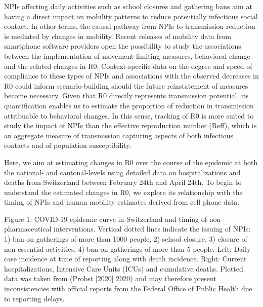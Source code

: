 NPIs affecting daily activities such as school closures and gathering bans aim at having a direct impact on mobility patterns to reduce potentially infectious social contact. In other terms, the causal pathway from NPIs to transmission reduction is mediated by changes in mobility. Recent releases of mobility data from smartphone software providers open the possibility to study the associations between the implementation of movement-limiting measures, behavioral change and the related changes in R0.  Context-specific data on the degree and speed of compliance to these types of NPIs and associations with the observed decreases in R0 could inform scenario-building should the future reinstatement of measures become necessary. Given that R0 directly represents transmission potential, its quantification enables us to estimate the proportion of reduction in transmission attribuable to behavioral changes. In this sense, tracking of R0 is more suited to study the impact of NPIs than the effective reproduction number (Reff), which is an aggregate measure of transmission capturing aspects of both infectious contacts and of population susceptibility.

Here, we aim at estimating changes in R0 over the course of the epidemic at both the national- and cantonal-levels using detailed data on hospitalizations and deaths from Switzerland between February 24th and April 24th. To begin to understand the estimated changes in R0, we explore its relationship with the timing of NPIs and human mobility estimates derived from cell phone data. 

Figure 1: COVID-19 epidemic curve in Switzerland and timing of non-pharmaceutical interventions.  Vertical dotted lines indicate the issuing of NPIs: 1) ban on gatherings of more than 1000 people, 2) school closure, 3) closure of non-essential activities, 4) ban on gatherings of more than 5 people.  Left: Daily case incidence at time of reporting along with death incidence. Right: Current hospitalizations, Intensive Care Units (ICUs) and cumulative deaths. Plotted data was taken from (Probst [2020] 2020) and may therefore present inconsistencies with official reports from the Federal Office of Public Health due to reporting delays. 

 


